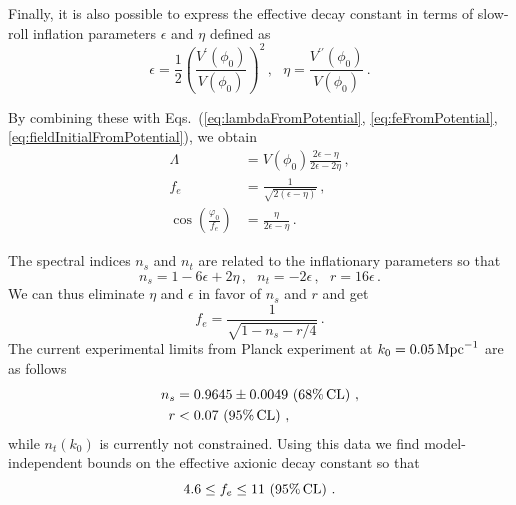 \documentclass[12pt]{article}
\begin{document}
Finally, it is also possible to express the effective decay constant in terms of slow-roll inflation parameters $\epsilon$ and $\eta$ defined as
\begin{equation} \label{eq:epsEtaFromPotential}
  \epsilon = \frac{1}{2} \left(\frac{V^\prime\left(\phi_0\right)}{V\left(\phi_0\right)}\right)^2\,,
  ~~~ \eta = \frac{V^{\prime\prime}\left(\phi_0\right)}{V\left(\phi_0\right)}\,.
\end{equation}

By combining these with Eqs.~(\ref{eq:lambdaFromPotential}, \ref{eq:feFromPotential}, \ref{eq:fieldInitialFromPotential}), we obtain
\begin{align} %
  \label{eq:lambdaSlowRoll}
  \Lambda &= V\left(\phi_0\right) \frac{2 \epsilon - \eta}{2 \epsilon - 2 \eta}\,,\\
  \label{eq:feSlowRoll}
  f_e &= \frac{1}{\sqrt{2 \left(\epsilon - \eta\right)}}\,,\\
  \label{eq:fieldInitialSlowRoll}
  \cos\left(\frac{\varphi_0}{f_e}\right) &= \frac{\eta}{2 \epsilon - \eta}\,.
\end{align}

The spectral indices $n_s$ and $n_t$ are related to the inflationary parameters so that
\begin{equation} \label{eq:observablesSlowRoll}
  n_s = 1 - 6 \epsilon + 2 \eta\,,
  ~~~ n_t = -2 \epsilon\,,
  ~~~ r = 16 \epsilon\,.
\end{equation}
We can thus eliminate $\eta$ and $\epsilon$ in favor of $n_s$ and $r$ and get
\begin{equation}
  f_e = \frac{1}{\sqrt{1 - n_s - r / 4}}\,.
\end{equation}
The current experimental limits from Planck experiment at $k_0 = 0.05\,{\rm Mpc}^{-1}$ are as follows~\cite{Adam:2015rua, Ade:2015lrj, Array:2015xqh}
\begin{equation} \label{data}
  \begin{aligned}
    n_s &= 0.9645 \pm 0.0049\, \left(68\%\, {\rm CL}\right)\,,\\
      r &< 0.07\, \left(95\%\, {\rm CL}\right)\,,
  \end{aligned}
\end{equation}
while $n_t\left(k_0\right)$ is currently not constrained.
Using this data we find model-independent bounds on the effective axionic decay constant so that
\begin{equation}
  4.6 \leq f_e \leq 11\, \left(95\%\, {\rm CL}\right)\,.
\end{equation}
\end{document}

